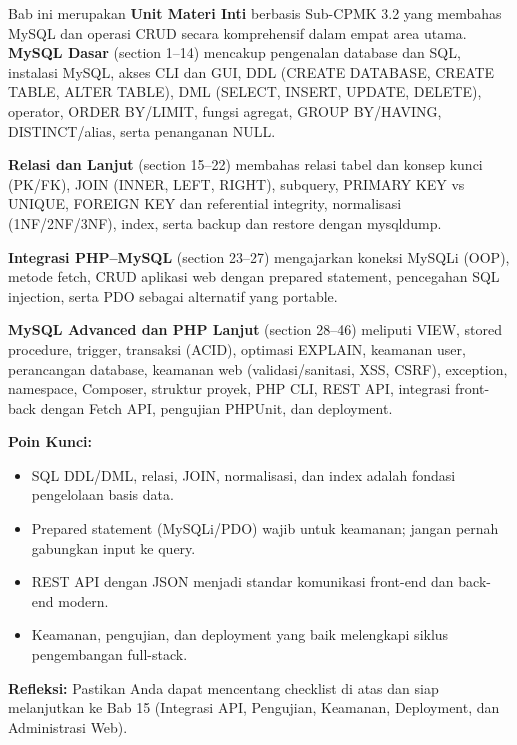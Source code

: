 \documentclass[../main.tex]{subfiles}
\begin{document}
\begin{rangkuman}
Bab ini merupakan \textbf{Unit Materi Inti} berbasis Sub-CPMK 3.2 yang membahas MySQL dan operasi CRUD secara komprehensif dalam empat area utama. \textbf{MySQL Dasar} (section 1--14) mencakup pengenalan database dan SQL, instalasi MySQL, akses CLI dan GUI, DDL (CREATE DATABASE, CREATE TABLE, ALTER TABLE), DML (SELECT, INSERT, UPDATE, DELETE), operator, ORDER BY/LIMIT, fungsi agregat, GROUP BY/HAVING, DISTINCT/alias, serta penanganan NULL.

\textbf{Relasi dan Lanjut} (section 15--22) membahas relasi tabel dan konsep kunci (PK/FK), JOIN (INNER, LEFT, RIGHT), subquery, PRIMARY KEY vs UNIQUE, FOREIGN KEY dan referential integrity, normalisasi (1NF/2NF/3NF), index, serta backup dan restore dengan mysqldump.

\textbf{Integrasi PHP--MySQL} (section 23--27) mengajarkan koneksi MySQLi (OOP), metode fetch, CRUD aplikasi web dengan prepared statement, pencegahan SQL injection, serta PDO sebagai alternatif yang portable.

\textbf{MySQL Advanced dan PHP Lanjut} (section 28--46) meliputi VIEW, stored procedure, trigger, transaksi (ACID), optimasi EXPLAIN, keamanan user, perancangan database, keamanan web (validasi/sanitasi, XSS, CSRF), exception, namespace, Composer, struktur proyek, PHP CLI, REST API, integrasi front-back dengan Fetch API, pengujian PHPUnit, dan deployment.

\textbf{Poin Kunci:}
\begin{itemize}
  \item SQL DDL/DML, relasi, JOIN, normalisasi, dan index adalah fondasi pengelolaan basis data.
  \item Prepared statement (MySQLi/PDO) wajib untuk keamanan; jangan pernah gabungkan input ke query.
  \item REST API dengan JSON menjadi standar komunikasi front-end dan back-end modern.
  \item Keamanan, pengujian, dan deployment yang baik melengkapi siklus pengembangan full-stack.
\end{itemize}

\textbf{Refleksi:} Pastikan Anda dapat mencentang checklist di atas dan siap melanjutkan ke Bab 15 (Integrasi API, Pengujian, Keamanan, Deployment, dan Administrasi Web).
\end{rangkuman}

\ifSubfilesClassLoaded{
  \renewcommand{\bibname}{Daftar Pustaka}
  
  
}{}
\end{document}
